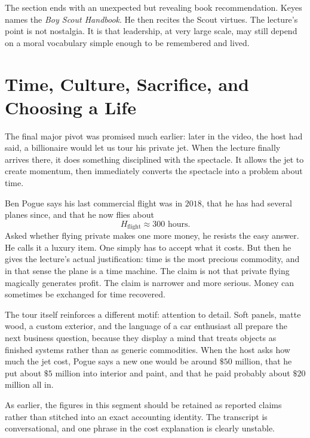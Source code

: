 The section ends with an unexpected but revealing book recommendation. Keyes names the \emph{Boy Scout Handbook}. He then recites the Scout virtues. The lecture's point is not nostalgia. It is that leadership, at very large scale, may still depend on a moral vocabulary simple enough to be remembered and lived.

\section{Time, Culture, Sacrifice, and Choosing a Life}

The final major pivot was promised much earlier: later in the video, the host had said, a billionaire would let us tour his private jet. When the lecture finally arrives there, it does something disciplined with the spectacle. It allows the jet to create momentum, then immediately converts the spectacle into a problem about time.

Ben Pogue says his last commercial flight was in \(2018\), that he has had several planes since, and that he now flies about
\begin{equation}
H_{\text{flight}} \approx 300 \text{ hours}.
\end{equation}
Asked whether flying private makes one more money, he resists the easy answer. He calls it a luxury item. One simply has to accept what it costs. But then he gives the lecture's actual justification: time is the most precious commodity, and in that sense the plane is a time machine. The claim is not that private flying magically generates profit. The claim is narrower and more serious. Money can sometimes be exchanged for time recovered.

The tour itself reinforces a different motif: attention to detail. Soft panels, matte wood, a custom exterior, and the language of a car enthusiast all prepare the next business question, because they display a mind that treats objects as finished systems rather than as generic commodities. When the host asks how much the jet cost, Pogue says a new one would be around \(\$50\) million, that he put about \(\$5\) million into interior and paint, and that he paid probably about \(\$20\) million all in.

\begin{remark}
As earlier, the figures in this segment should be retained as reported claims rather than stitched into an exact accounting identity. The transcript is conversational, and one phrase in the cost explanation is clearly unstable.
\end{remark}

